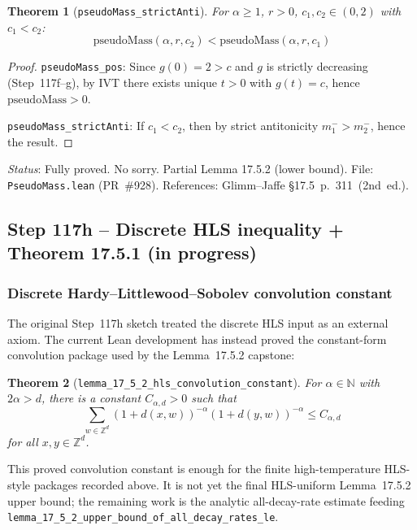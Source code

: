 \documentclass[a4paper,11pt]{article}
\newtheorem{theorem}{Theorem}
\begin{document}
\begin{theorem}[\texttt{pseudoMass\_strictAnti}]
For $\alpha \ge 1$, $r > 0$, $c_1, c_2 \in (0,2)$ with $c_1 < c_2$:
\[
  \mathrm{pseudoMass}(\alpha, r, c_2) < \mathrm{pseudoMass}(\alpha, r, c_1)
\]
\end{theorem}

\begin{proof}
\texttt{pseudoMass\_pos}: Since $g(0) = 2 > c$ and $g$ is strictly decreasing (Step~117f--g),
by IVT there exists unique $t > 0$ with $g(t) = c$, hence $\mathrm{pseudoMass} > 0$.

\texttt{pseudoMass\_strictAnti}: If $c_1 < c_2$, then by strict antitonicity $m_1^- > m_2^-$,
hence the result.
\end{proof}

\noindent\textit{Status}: Fully proved. No sorry. Partial Lemma 17.5.2 (lower bound).
File: \texttt{PseudoMass.lean} (PR~\#928).
References: Glimm--Jaffe \S17.5~p.~311~(2nd~ed.).

\subsection*{Step 117h -- Discrete HLS inequality + Theorem 17.5.1 (in progress)}

\subsubsection*{Discrete Hardy--Littlewood--Sobolev convolution constant}

The original Step~117h sketch treated the discrete HLS input as an external
axiom.  The current Lean development has instead proved the constant-form
convolution package used by the Lemma~17.5.2 capstone:

\begin{theorem}[\texttt{lemma\_17\_5\_2\_hls\_convolution\_constant}]
For $\alpha \in \mathbb{N}$ with $2\alpha > d$, there is a constant
$C_{\alpha,d}>0$ such that
\[
  \sum_{w \in \mathbb{Z}^d}
    (1+d(x,w))^{-\alpha}(1+d(y,w))^{-\alpha}
  \le C_{\alpha,d}
\]
for all $x,y \in \mathbb{Z}^d$.
\end{theorem}

This proved convolution constant is enough for the finite high-temperature
HLS-style packages recorded above.  It is not yet the final HLS-uniform
Lemma~17.5.2 upper bound; the remaining work is the analytic all-decay-rate
estimate feeding \texttt{lemma\_17\_5\_2\_upper\_bound\_of\_all\_decay\_rates\_le}.
\end{document}

